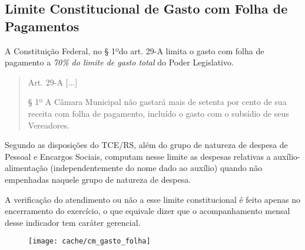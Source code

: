 
\subsection[Gastos com Folha de Pagamentos]{Limite Constitucional de Gasto com Folha de Pagamentos}

A Constituição Federal, no § 1ºdo art. 29-A limita o gasto com folha de pagamento a \textit{70\% do limite de gasto total} do Poder Legislativo.

\begin{quotation}
Art. 29-A [...]
 
§ 1º A Câmara Municipal não gastará mais de setenta por cento de sua receita com folha de pagamento, incluído o gasto com o subsídio de seus Vereadores.
\end{quotation}

Segundo as disposições do TCE/RS, além do grupo de natureza de despesa de Pessoal e Encargos Sociais, computam nesse limite as despesas relativas a auxílio-alimentação (independentemente do nome dado ao auxílio) quando não empenhadas naquele grupo de natureza de despesa.



A verificação do atendimento ou não a esse limite constitucional é feito apenas no encerramento do exercício, o que equivale dizer que o acompanhamento mensal desse indicador tem caráter gerencial.

\begin{figure}[H]
\center
\texttt{[image: cache/cm\_gasto\_folha]}
\end{figure}

